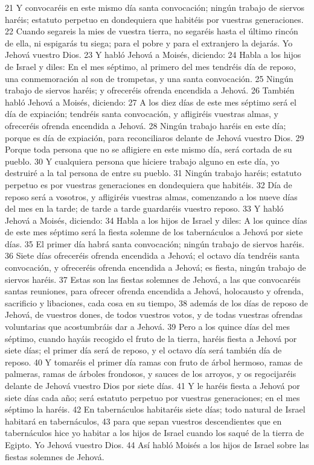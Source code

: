 21 Y convocaréis en este mismo día santa convocación; ningún trabajo de siervos haréis; estatuto perpetuo en dondequiera que habitéis por vuestras generaciones.
22 Cuando segareis la mies de vuestra tierra, no segaréis hasta el último rincón de ella, ni espigarás tu siega; para el pobre y para el extranjero la dejarás. Yo Jehová vuestro Dios.
23 Y habló Jehová a Moisés, diciendo:
24 Habla a los hijos de Israel y diles: En el mes séptimo, al primero del mes tendréis día de reposo, una conmemoración al son de trompetas, y una santa convocación.
25 Ningún trabajo de siervos haréis; y ofreceréis ofrenda encendida a Jehová.
26 También habló Jehová a Moisés, diciendo:
27 A los diez días de este mes séptimo será el día de expiación; tendréis santa convocación, y afligiréis vuestras almas, y ofreceréis ofrenda encendida a Jehová.
28 Ningún trabajo haréis en este día; porque es día de expiación, para reconciliaros delante de Jehová vuestro Dios.
29 Porque toda persona que no se afligiere en este mismo día, será cortada de su pueblo.
30 Y cualquiera persona que hiciere trabajo alguno en este día, yo destruiré a la tal persona de entre su pueblo.
31 Ningún trabajo haréis; estatuto perpetuo es por vuestras generaciones en dondequiera que habitéis.
32 Día de reposo será a vosotros, y afligiréis vuestras almas, comenzando a los nueve días del mes en la tarde; de tarde a tarde guardaréis vuestro reposo.
33 Y habló Jehová a Moisés, diciendo:
34 Habla a los hijos de Israel y diles: A los quince días de este mes séptimo será la fiesta solemne de los tabernáculos a Jehová por siete días.
35 El primer día habrá santa convocación; ningún trabajo de siervos haréis.
36 Siete días ofreceréis ofrenda encendida a Jehová; el octavo día tendréis santa convocación, y ofreceréis ofrenda encendida a Jehová; es fiesta, ningún trabajo de siervos haréis.
37 Estas son las fiestas solemnes de Jehová, a las que convocaréis santas reuniones, para ofrecer ofrenda encendida a Jehová, holocausto y ofrenda, sacrificio y libaciones, cada cosa en su tiempo,
38 además de los días de reposo de Jehová, de vuestros dones, de todos vuestros votos, y de todas vuestras ofrendas voluntarias que acostumbráis dar a Jehová.
39 Pero a los quince días del mes séptimo, cuando hayáis recogido el fruto de la tierra, haréis fiesta a Jehová por siete días; el primer día será de reposo, y el octavo día será también día de reposo.
40 Y tomaréis el primer día ramas con fruto de árbol hermoso, ramas de palmeras, ramas de árboles frondosos, y sauces de los arroyos, y os regocijaréis delante de Jehová vuestro Dios por siete días.
41 Y le haréis fiesta a Jehová por siete días cada año; será estatuto perpetuo por vuestras generaciones; en el mes séptimo la haréis.
42 En tabernáculos habitaréis siete días; todo natural de Israel habitará en tabernáculos,
43 para que sepan vuestros descendientes que en tabernáculos hice yo habitar a los hijos de Israel cuando los saqué de la tierra de Egipto. Yo Jehová vuestro Dios.
44 Así habló Moisés a los hijos de Israel sobre las fiestas solemnes de Jehová.


